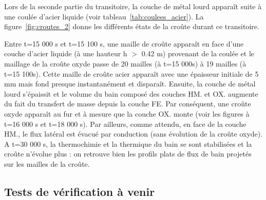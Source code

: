 Lors de la seconde partie du transitoire, la couche de métal lourd apparaît suite à une coulée d'acier liquide (voir tableau~\ref{tab:coulees_acier}). La figure~\ref{fig:croutes_2} donne les différents états de la croûte durant ce transitoire.

Entre t=15 000 s et t=15 100 s, une maille de croûte apparaît en face d'une couche d'acier liquide (à une hauteur h $>$ 0.42 m) provenant de la coulée et le maillage de la croûte oxyde passe de 20 mailles (à t=15 000s) à 19 mailles (à t=15 100s). Cette maille de croûte acier apparaît avec une épaisseur initiale de 5 mm mais fond presque instantanément et disparaît. Ensuite, la couche de métal lourd s'épaissit et le volume du bain composé des couches HM. et OX. augmente du fait du transfert de masse depuis la couche FE. Par conséquent, une croûte oxyde apparaît au fur et à mesure que la couche OX. monte (voir les figures à t=16 000 s et t=18 000 s). Par ailleurs, comme attendu, en face de la couche HM., le flux latéral est évacué par conduction (sans évolution de la croûte oxyde). A t=30 000 s, la thermochimie et la thermique du bain se sont stabilisées et la croûte n'évolue plus : on retrouve bien les profils plats de flux de bain projetés sur les mailles de la croûte.
\fi

\subsection{Tests de vérification à venir}
